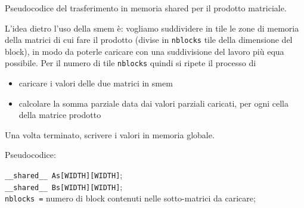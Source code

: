 \begin{questions}
    \question Pseudocodice del trasferimento in memoria shared per il prodotto matriciale.
    
    \begin{solution}
        L'idea dietro l'uso della smem è: vogliamo suddividere in tile le zone di memoria della matrici di cui fare il prodotto (divise in \texttt{nblocks} tile della dimensione del block), in modo da poterle caricare con una suddivisione del lavoro più equa possibile. Per il numero di tile \texttt{nblocks} quindi si ripete il processo di 
        \begin{itemize}
            \item caricare i valori delle due matrici in smem
            
            \item calcolare la somma parziale data dai valori parziali caricati, per ogni cella della matrice prodotto
        \end{itemize}
        
        Una volta terminato, scrivere i valori in memoria globale.
        
        Pseudocodice:
        \begin{center}
            \begin{minipage}{.9\textwidth}
                \begin{tcolorbox}[
                    colback=white,
                    sharp corners,
                    boxrule=.3mm,
                    left=20pt,
                    top=0pt,
                    bottom=0pt,
                    colbacktitle=white,
                    coltitle=black
                    ]
                    \LinesNumbered
                    \begin{algorithm}[H]
                        \SetAlgoNoEnd
                        \texttt{\_\_shared\_\_ As[WIDTH][WIDTH]}; \\
                        \texttt{\_\_shared\_\_ Bs[WIDTH][WIDTH]}; \\
                        \texttt{nblocks =} numero di block contenuti nelle sotto-matrici da caricare; \\
\end{algorithm}
\end{tcolorbox}
\end{minipage}
\end{center}
\end{solution}
\end{questions}
